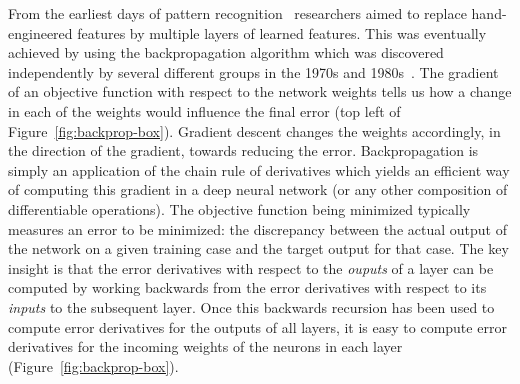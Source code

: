 \documentclass[10pts]{article}
\begin{document}
From the earliest days of pattern recognition~\citep{selfridge,Rosenblatt57}
researchers aimed to replace hand-engineered features by multiple layers of
learned features.  This was eventually achieved by using the
backpropagation algorithm which was discovered independently by several
different groups in the 1970s and 1980s~\citep{Werbos74,Parker85,LeCun85,RHW}.  
The gradient of an objective function with respect to the network
weights tells us how a change in each of the weights would influence
the final error (top left of Figure~\ref{fig:backprop-box}).
Gradient descent changes the weights accordingly, in the direction of the
gradient, towards reducing the error.
Backpropagation is simply an application of
the chain rule of derivatives 
which yields an efficient way of computing this gradient in
a deep neural network (or any other composition of differentiable operations).
The objective function being minimized typically measures an error to be minimized: 
the discrepancy between
the actual output of the network on a given training case and the target
output for that case.  The key insight is that the error derivatives with
respect to the {\it ouputs} of a layer can be computed by working
backwards from the error derivatives with respect to its {\em inputs}
to the subsequent layer.
Once this backwards recursion has been used to compute
error derivatives for the outputs of all layers, it is easy to compute
error derivatives for the incoming weights of the neurons in each layer 
(Figure~\ref{fig:backprop-box}).
\end{document}
